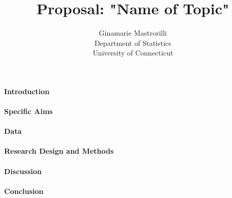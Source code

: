 \documentclass[12pt]{article}
\title{Proposal: "Name of Topic"}
\author{Ginamarie Mastrorilli\\
  Department of Statistics\\
  University of Connecticut
}
\begin{document}
\maketitle


\paragraph{Introduction}
\lipsum[1] \citep{dwivedi2017analysis}

\paragraph{Specific Aims}
\lipsum[2]

\paragraph{Data}
\lipsum[3]

\paragraph{Research Design and Methods}
\lipsum[4]

\paragraph{Discussion}
\lipsum[5] \citep{wild2004global}

\paragraph{Conclusion}
\lipsum[1]




\end{document}
